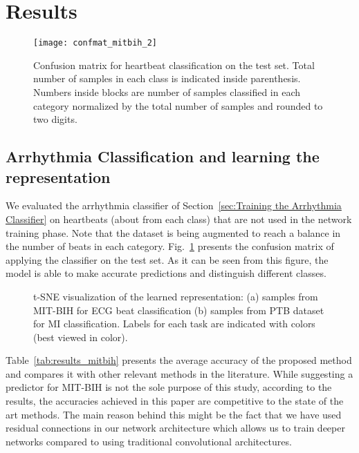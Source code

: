 \documentclass[10pt, conference, compsocconf]{IEEEtran}
\begin{document}
\section{Results}
\label{sec:Results}

\begin{figure}[!t]
\centering
\texttt{[image: confmat\_mitbih\_2]}\caption{Confusion matrix for heartbeat classification on the test set. Total number of samples in each class is indicated inside parenthesis. Numbers inside blocks are number of samples classified in each category normalized by the total number of samples and rounded to two digits.}
\label{fig:confmat_mitbih}
\end{figure}

\subsection{Arrhythmia Classification and learning the representation}
We evaluated the arrhythmia classifier of Section~\ref{sec:Training the Arrhythmia Classifier} on  heartbeats (about  from each class) that are not used in the network training phase. Note that the dataset is being augmented to reach a balance in the number of beats in each category. Fig.~\ref{fig:confmat_mitbih} presents the confusion matrix of applying the classifier on the test set. As it can be seen from this figure, the model is able to make accurate predictions and distinguish different classes.



\begin{figure*}[!t]
\centering
{}
\caption{t-SNE visualization of the learned representation: (a) samples from MIT-BIH for ECG beat classification (b) samples from PTB dataset for MI classification. Labels for each task are indicated with colors (best viewed in color).}
\label{fig:tsne}
\end{figure*}

Table~\ref{tab:results_mitbih} presents the average accuracy of the proposed method and compares it with other relevant methods in the literature. While suggesting a predictor for MIT-BIH is not the sole purpose of this study, according to the results, the accuracies achieved in this paper are competitive to the state of the art methods. The main reason behind this might be the fact that we have used residual connections in our network architecture which allows us to train deeper networks compared to using traditional convolutional architectures.
\end{document}
